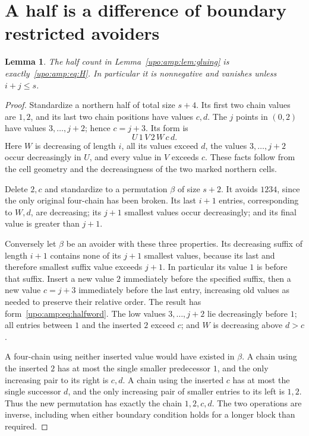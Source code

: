 \documentclass[11pt,letterpaper]{article}
\newtheorem{lemma}[theorem]{Lemma}
\theoremstyle{remark}\newtheorem{remark}[theorem]{Remark}
\numberwithin{equation}{section}
\begin{document}
\section{A half is a difference of boundary restricted avoiders}\label{upo:amp:sec:halves}
\begin{lemma}\label{upo:amp:lem:half}
The half count in Lemma~\ref{upo:amp:lem:gluing} is exactly~\eqref{upo:amp:eq:H}. In
particular it is nonnegative and vanishes unless $i+j\le s$.
\end{lemma}
\begin{proof}
Standardize a northern half of total size $s+4$. Its first two chain
values are $1,2$, and its last two chain positions have values $c,d$.
The $j$ points in $(0,2)$ have values $3,\ldots,j+2$; hence $c=j+3$.
Its form is
\begin{equation}\label{upo:amp:eq:halfword}
U\,1\,V\,2\,W\,c\,d.
\end{equation}
Here $W$ is decreasing of length $i$, all its values exceed $d$, the values
$3,\ldots,j+2$ occur decreasingly in $U$, and every value in $V$ exceeds
$c$. These facts follow from the cell geometry and the decreasingness of
the two marked northern cells.

Delete $2,c$ and standardize to a permutation $\beta$ of size $s+2$.
It avoids $1234$, since the only original four-chain has been broken.
Its last $i+1$ entries, corresponding to $W,d$, are decreasing; its
$j+1$ smallest values occur decreasingly; and its final value is greater
than $j+1$.

Conversely let $\beta$ be an avoider with these three properties.
Its decreasing suffix of length $i+1$ contains none of its $j+1$ smallest
values, because its last and therefore smallest suffix value exceeds
$j+1$. In particular its value $1$ is before that suffix. Insert a new
value $2$ immediately before the specified suffix, then a new value
$c=j+3$ immediately before the last entry, increasing old values as
needed to preserve their relative order. The result has
form~\eqref{upo:amp:eq:halfword}. The low values $3,\ldots,j+2$ lie decreasingly
before $1$; all entries between $1$ and the inserted $2$ exceed $c$;
and $W$ is decreasing above $d>c$.

A four-chain using neither inserted value would have existed in $\beta$.
A chain using the inserted $2$ has at most the single smaller predecessor
$1$, and the only increasing pair to its right is $c,d$. A chain using
the inserted $c$ has at most the single successor $d$, and the only
increasing pair of smaller entries to its left is $1,2$. Thus the new
permutation has exactly the chain $1,2,c,d$. The two operations are
inverse, including when either boundary condition holds for a longer
block than required.


\end{proof}
\end{document}

